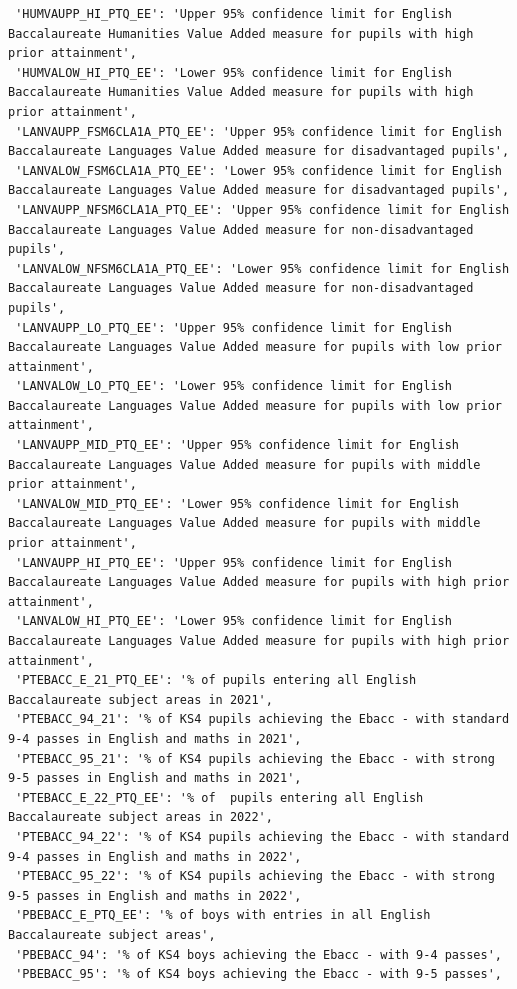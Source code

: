 \documentclass[
  letterpaper,
  DIV=11,
  numbers=noendperiod]{scrartcl}
\begin{document}
\begin{verbatim}
 'HUMVAUPP_HI_PTQ_EE': 'Upper 95% confidence limit for English Baccalaureate Humanities Value Added measure for pupils with high prior attainment',
 'HUMVALOW_HI_PTQ_EE': 'Lower 95% confidence limit for English Baccalaureate Humanities Value Added measure for pupils with high prior attainment',
 'LANVAUPP_FSM6CLA1A_PTQ_EE': 'Upper 95% confidence limit for English Baccalaureate Languages Value Added measure for disadvantaged pupils',
 'LANVALOW_FSM6CLA1A_PTQ_EE': 'Lower 95% confidence limit for English Baccalaureate Languages Value Added measure for disadvantaged pupils',
 'LANVAUPP_NFSM6CLA1A_PTQ_EE': 'Upper 95% confidence limit for English Baccalaureate Languages Value Added measure for non-disadvantaged pupils',
 'LANVALOW_NFSM6CLA1A_PTQ_EE': 'Lower 95% confidence limit for English Baccalaureate Languages Value Added measure for non-disadvantaged pupils',
 'LANVAUPP_LO_PTQ_EE': 'Upper 95% confidence limit for English Baccalaureate Languages Value Added measure for pupils with low prior attainment',
 'LANVALOW_LO_PTQ_EE': 'Lower 95% confidence limit for English Baccalaureate Languages Value Added measure for pupils with low prior attainment',
 'LANVAUPP_MID_PTQ_EE': 'Upper 95% confidence limit for English Baccalaureate Languages Value Added measure for pupils with middle prior attainment',
 'LANVALOW_MID_PTQ_EE': 'Lower 95% confidence limit for English Baccalaureate Languages Value Added measure for pupils with middle prior attainment',
 'LANVAUPP_HI_PTQ_EE': 'Upper 95% confidence limit for English Baccalaureate Languages Value Added measure for pupils with high prior attainment',
 'LANVALOW_HI_PTQ_EE': 'Lower 95% confidence limit for English Baccalaureate Languages Value Added measure for pupils with high prior attainment',
 'PTEBACC_E_21_PTQ_EE': '% of pupils entering all English Baccalaureate subject areas in 2021',
 'PTEBACC_94_21': '% of KS4 pupils achieving the Ebacc - with standard 9-4 passes in English and maths in 2021',
 'PTEBACC_95_21': '% of KS4 pupils achieving the Ebacc - with strong 9-5 passes in English and maths in 2021',
 'PTEBACC_E_22_PTQ_EE': '% of  pupils entering all English Baccalaureate subject areas in 2022',
 'PTEBACC_94_22': '% of KS4 pupils achieving the Ebacc - with standard 9-4 passes in English and maths in 2022',
 'PTEBACC_95_22': '% of KS4 pupils achieving the Ebacc - with strong 9-5 passes in English and maths in 2022',
 'PBEBACC_E_PTQ_EE': '% of boys with entries in all English Baccalaureate subject areas',
 'PBEBACC_94': '% of KS4 boys achieving the Ebacc - with 9-4 passes',
 'PBEBACC_95': '% of KS4 boys achieving the Ebacc - with 9-5 passes',

\end{verbatim}
\end{document}
